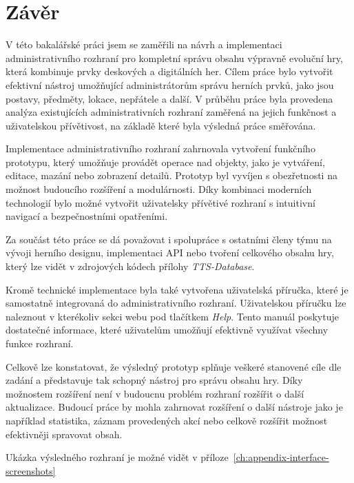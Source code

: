 \chapter{Závěr}
\label{ch:conclusion}

V této bakalářské práci jsem se zaměřili na návrh a implementaci administrativního rozhraní pro kompletní správu obsahu výpravně evoluční hry, která kombinuje prvky deskových a digitálních her. Cílem práce bylo vytvořit efektivní nástroj umožňující administrátorům správu herních prvků, jako jsou postavy, předměty, lokace, nepřátele a další. V průběhu práce byla provedena analýza existujících administrativních rozhraní zaměřená na jejich funkčnost a uživatelskou přívětivost, na základě které byla výsledná práce směřována.

Implementace administrativního rozhraní zahrnovala vytvoření funkčního prototypu, který umožňuje provádět operace nad objekty, jako je vytváření, editace, mazání nebo zobrazení detailů. Prototyp byl vyvíjen s obezřetnosti na možnost budoucího rozšíření a modulárnosti. Díky kombinaci moderních technologií bylo možné vytvořit uživatelsky přívětivé rozhraní s intuitivní navigací a bezpečnostními opatřeními.

Za součást této práce se dá považovat i spolupráce s ostatními členy týmu na vývoji herního designu, implementaci API nebo tvoření celkového obsahu hry, který lze vidět v zdrojových kódech přílohy \textit{TTS-Database}.

Kromě technické implementace byla také vytvořena uživatelská příručka, které je samostatně integrovaná do administrativního rozhraní. Uživatelskou příručku lze naleznout v kterékoliv sekci webu pod tlačítkem \textit{Help}. Tento manuál poskytuje dostatečné informace, které uživatelům umožňují efektivně využívat všechny funkce rozhraní.

Celkově lze konstatovat, že výsledný prototyp splňuje veškeré stanovené cíle dle zadání a představuje tak schopný nástroj pro správu obsahu hry. Díky možnostem rozšíření není v budoucnu problém rozhraní rozšířit o další aktualizace. Budoucí práce by mohla zahrnovat rozšíření o další nástroje jako je například statistika, záznam provedených akcí nebo celkově rozšířit možnost efektivněji spravovat obsah.

Ukázka výsledného rozhraní je možné vidět v příloze~\ref{ch:appendix-interface-screenshots}

\endinput